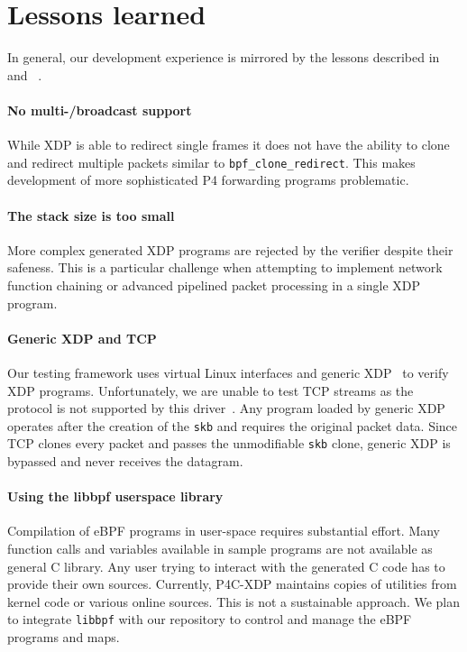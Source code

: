 \section{Lessons learned}\label{sec:conclusions}

In general, our development experience is mirrored by the lessons described
in~\cite{minao-hspr18} and ~\cite{bertin-netdev17}.

\paragraph{No multi-/broadcast support}
While XDP is able to redirect single frames it does not have the ability to 
clone and redirect multiple packets similar to \texttt{bpf\_clone\_redirect}. 
This makes development of more sophisticated P4 forwarding programs problematic.

\paragraph{The stack size is too small}
More complex generated XDP programs are rejected by the verifier despite their 
safeness. 
This is a particular challenge when attempting to implement network function 
chaining or advanced pipelined packet processing in a single XDP program. 

\paragraph{Generic XDP and TCP}
Our testing framework uses virtual Linux interfaces and generic 
XDP~\cite{genericxdp} to verify XDP programs. 
Unfortunately, we are unable to test TCP streams as the protocol is not 
supported by this driver~\cite{xdptcp}.
Any program loaded by generic XDP operates after the creation of
the \texttt{skb} and requires the original packet data. Since TCP clones every 
packet and passes the unmodifiable \texttt{skb} clone, generic XDP is
bypassed and never receives the datagram.

\paragraph{Using the libbpf userspace library}
Compilation of eBPF programs in user-space requires substantial 
effort. Many function calls and variables available in sample programs are not 
available as general C library. Any user trying to interact with the 
generated C code has to provide their own sources. Currently, P4C-XDP maintains 
copies of utilities from kernel code or various online sources. This is not a 
sustainable approach. We plan to integrate \texttt{libbpf} with our repository 
to control and manage the eBPF programs and maps.

